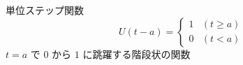 \begin{frame}{単位ステップ関数}
  \[
    U(t-a) = \begin{cases} 1 & (t \geq a) \\ 0 & (t < a) \end{cases}
  \]
  $t = a$ で $0$ から $1$ に跳躍する階段状の関数
\end{frame}

